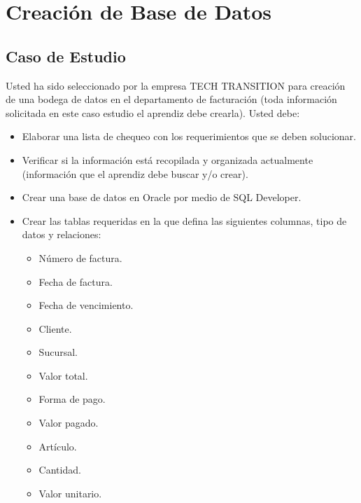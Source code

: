 \section{Creación de Base de Datos}
	\subsection{Caso de Estudio}
	Usted ha sido seleccionado por la empresa TECH TRANSITION para creación de una bodega de datos en
	el departamento de facturación (toda información solicitada en este caso estudio el aprendiz debe
	crearla). Usted debe:
	\begin{itemize}
		\item Elaborar una lista de chequeo con los requerimientos que se deben solucionar.
		\item Verificar si la información está recopilada y organizada actualmente (información que el
		aprendiz debe buscar y/o crear).
		\item Crear una base de datos en Oracle por medio de SQL Developer.
		\item Crear las tablas requeridas en la que defina las siguientes columnas, tipo de datos y relaciones:
			\begin{itemize}
				\item Número de factura.
				\item Fecha de factura.
				\item Fecha de vencimiento.
				\item Cliente.
				\item Sucursal.
				\item Valor total.
				\item Forma de pago.
				\item Valor pagado.
				\item Artículo.
				\item Cantidad.
				\item Valor unitario.
			\end{itemize}
		
	\end{itemize}
	
